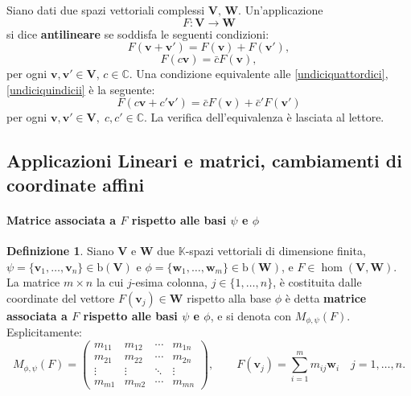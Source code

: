 \documentclass{article}
\theoremstyle{plain}
\theoremstyle{definition}
\newtheorem{defn}{Definizione}[section]
\theoremstyle{remark}
\begin{document}
Siano dati due spazi vettoriali complessi $\mathbf{V},\,\mathbf{W}$. Un'applicazione
\[
F \colon \mathbf{V} \to \mathbf{W}
\]
si dice \textbf{antilineare} se soddisfa le seguenti condizioni:
\begin{equation}\label{undiciquattordici}
F(\mathbf{v} + \mathbf{v}') = F(\mathbf{v}) + F(\mathbf{v}'),    
\end{equation}
\begin{equation}\label{undiciquindicii}
F(c\mathbf{v}) = \bar{c} F(\mathbf{v}),    
\end{equation}
per ogni $\mathbf{v}, \mathbf{v}'\in \mathbf{V}$, $c \in \mathbb{C}$. 
Una condizione equivalente alle \ref{undiciquattordici}, \ref{undiciquindicii} è la seguente:
\[
F(c\mathbf{v} + c'\mathbf{v}') = \bar{c} F(\mathbf{v}) + \bar{c}' F(\mathbf{v}')
\]
per ogni $\mathbf{v}, \mathbf{v}'\in \mathbf{V},\;c, c' \in \mathbb{C}$. 
La verifica dell'equivalenza è lasciata al lettore.

\vspace{50pt}
\subsection{Applicazioni Lineari e matrici, cambiamenti di coordinate affini}
\vspace{20pt}

\paragraph{Matrice associata a $F$ rispetto alle basi $\psi$ e $\phi$}
\begin{bxthm}
\begin{defn}
Siano $\mathbf{V}$ e $\mathbf{W}$ due $\mathbb{K}$-spazi vettoriali di dimensione finita, 
$\psi = \{\mathbf{v}_1, \ldots, \mathbf{v}_n\}\in\mathrm{b}(\mathbf{V})$ e $\phi = \{\mathbf{w}_1, \ldots, \mathbf{w}_m\}\in\mathrm{b}(\mathbf{W})$, 
e $F\in\hom(\mathbf{V},\mathbf{W})$.
La matrice $m \times n$ la cui $j$-esima colonna, $j\in \{1, \ldots, n\}$, è costituita dalle coordinate del vettore $F(\mathbf{v}_j) \in \mathbf{W}$ 
rispetto alla base $\phi$ è detta \textbf{matrice associata a $F$ rispetto alle basi $\psi$ e $\phi$}, e 
si denota con $M_{\phi,\psi}(F)$. 
Esplicitamente:
\[
M_{\phi,\psi}(F) =
\begin{pmatrix}
m_{11} & m_{12} & \cdots & m_{1n} \\
m_{21} & m_{22} & \cdots & m_{2n} \\
\vdots & \vdots & \ddots & \vdots \\
m_{m1} & m_{m2} & \cdots & m_{mn}
\end{pmatrix},\quad\quad F(\mathbf{v}_j) = \sum_{i=1}^{m}m_{ij}\mathbf{w}_i\quad j = 1, \ldots, n.
\]
\end{defn}
\end{bxthm}
\end{document}
